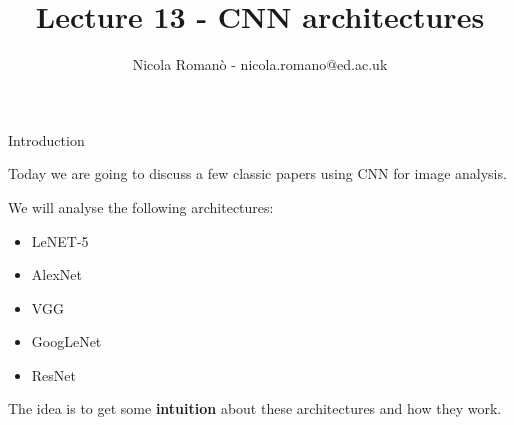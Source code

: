 \documentclass[9pt, aspectratio=169]{beamer}
\author{Nicola Roman\`o - nicola.romano@ed.ac.uk}
\title{Lecture 13 - CNN architectures}
\date{}
\begin{document}

\begin{frame}
    \titlepage
\end{frame}

\begin{frame}
    {Introduction}

    Today we are going to discuss a few classic papers using CNN for image analysis.

    We will analyse the following architectures:

    \begin{itemize}
        \item LeNET-5
        \item AlexNet
        \item VGG
        \item GoogLeNet
        \item ResNet
    \end{itemize}

    The idea is to get some \textbf{intuition} about these architectures and how they work.
\end{frame}
\end{document}
